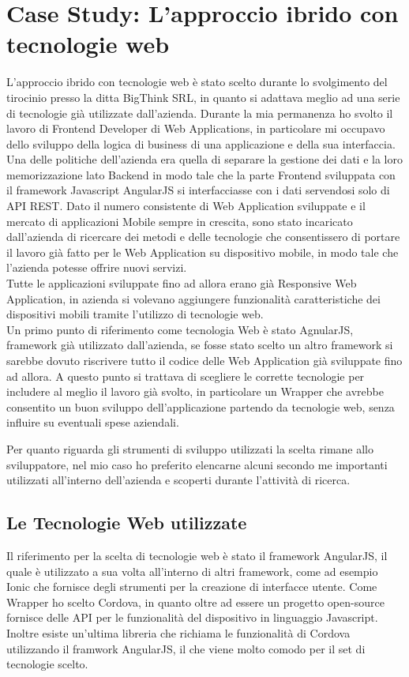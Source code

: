 \chapter{Case Study: L'approccio ibrido con tecnologie web}

L'approccio ibrido con tecnologie web è stato scelto durante lo svolgimento del tirocinio presso la ditta BigThink SRL, in quanto si adattava meglio ad una serie di tecnologie già utilizzate dall'azienda.
Durante la mia permanenza ho svolto il lavoro di Frontend Developer di Web Applications, in particolare mi occupavo dello sviluppo della logica di business di una applicazione e della sua interfaccia.
Una delle politiche dell'azienda era quella di separare la gestione dei dati e la loro memorizzazione lato Backend in modo tale che la parte Frontend sviluppata con il framework Javascript AngularJS si interfacciasse con i dati servendosi solo di API REST.
Dato il numero consistente di Web Application sviluppate e il mercato di applicazioni Mobile sempre in crescita, sono stato incaricato dall'azienda di ricercare dei metodi e delle tecnologie che consentissero di portare il lavoro già fatto per le Web Application su dispositivo mobile, in modo tale che l'azienda potesse offrire nuovi servizi.\\
Tutte le applicazioni sviluppate fino ad allora erano già Responsive Web Application, in azienda si volevano aggiungere funzionalità caratteristiche dei dispositivi mobili tramite l'utilizzo di tecnologie web.\\

Un primo punto di riferimento come tecnologia Web è stato AgnularJS, framework già utilizzato dall'azienda, se fosse stato scelto un altro framework si sarebbe dovuto riscrivere tutto il codice delle Web Application già sviluppate fino ad allora. A questo punto  si trattava di scegliere le corrette tecnologie per includere al meglio il lavoro già svolto, in particolare un Wrapper che avrebbe consentito un buon sviluppo dell'applicazione partendo da tecnologie web, senza influire su eventuali spese aziendali. 

Per quanto riguarda gli strumenti di sviluppo utilizzati la scelta rimane allo sviluppatore, nel mio caso ho preferito elencarne alcuni secondo me importanti utilizzati all'interno dell'azienda e scoperti durante l'attività di ricerca.

\section{Le Tecnologie Web utilizzate}
Il riferimento per la scelta di tecnologie web è stato il framework AngularJS, il quale è utilizzato a sua volta all'interno di altri framework, come ad esempio Ionic che fornisce degli strumenti per la creazione di interfacce utente. Come Wrapper ho scelto Cordova, in quanto oltre ad essere un progetto open-source fornisce delle API per le funzionalità del dispositivo in linguaggio Javascript. Inoltre esiste un'ultima libreria che richiama le funzionalità di Cordova utilizzando il framwork AngularJS, il che viene molto comodo per il set di tecnologie scelto.

